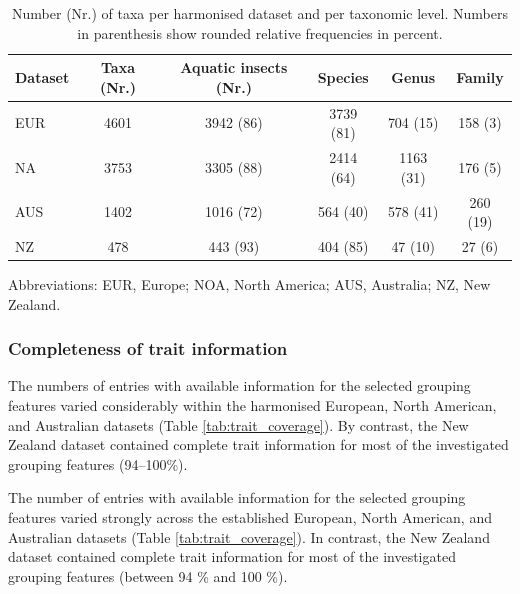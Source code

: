 \documentclass[12pt]{article}
\begin{document}
\begin{table}[ht]
    \centering
    \caption{Number (Nr.) of taxa per harmonised dataset and per taxonomic level. Numbers in parenthesis show rounded relative frequencies in percent.} 
    \label{tab:tax_coverage}
    \begin{tabular}{l|c|c|c|c|c}
    \toprule[.1em]
    Dataset & Taxa (Nr.) & Aquatic insects (Nr.) & Species & Genus & Family \\ 
    \toprule[.1em]
    EUR & 4601 & 3942 (86) & 3739 (81) & 704 (15) & 158 (3) \\ 
    NA & 3753 & 3305 (88) & 2414 (64) & 1163 (31) & 176 (5)  \\ 
    AUS & 1402 & 1016 (72) & 564 (40) & 578 (41) & 260 (19) \\ 
    NZ & 478 & 443 (93) & 404 (85) & 47 (10) & 27 (6) \\ 
    \bottomrule
    \end{tabular}
\end{table}
\begin{minipage}{\linewidth}{\fontsize{8}{10}\selectfont
\centering
Abbreviations: EUR, Europe; NOA, North America; AUS, Australia; NZ, New Zealand.
}
\end{minipage}



\subsubsection*{Completeness of trait information}

The numbers of entries with available information for the selected grouping features varied considerably within the harmonised European, North American, and Australian datasets (Table \ref{tab:trait_coverage}). By contrast, the New Zealand dataset contained complete trait information for most of the investigated grouping features (94–100\%).

The number of entries with available information for the selected grouping features varied strongly across the established European, North American, and Australian datasets (Table \ref{tab:trait_coverage}). In contrast, the New Zealand dataset contained complete trait information for most of the investigated grouping features (between 94 \% and 100 \%).
\end{document}
